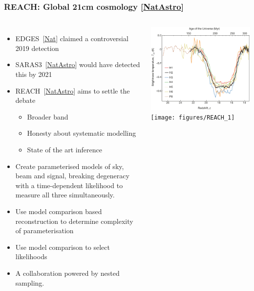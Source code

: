 \documentclass[aspectratio=169]{beamer}
\begin{document}
\begin{frame}
    \frametitle{REACH: Global 21cm cosmology [\href{https://www.nature.com/articles/s41550-022-01709-9}{NatAstro}]}
    \begin{columns}
        \begin{itemize}
            \item EDGES~[\href{https://www.nature.com/articles/nature25792}{Nat}] claimed a controversial 2019 detection
            \item SARAS3~[\href{https://www.nature.com/articles/s41550-022-01610-5}{NatAstro}]  would have detected this by 2021
            \item REACH~[\href{https://www.nature.com/articles/s41550-022-01709-9}{NatAstro}] aims to settle the debate
                \begin{itemize}
                    \item Broader band
                    \item Honesty about systematic modelling
                    \item State of the art inference
                \end{itemize}
            \item Create parameterised models of sky, beam and signal, breaking degeneracy with a time-dependent likelihood to measure all three simultaneously.
            \item Use model comparison based reconstruction to determine complexity of parameterisation
            \item Use model comparison to select likelihoods
            \item A collaboration powered by nested sampling.
        \end{itemize}

        \includegraphics[width=\textwidth]{figures/EDGES}
        \texttt{[image: figures/REACH\_1]}

    \end{columns}

\end{frame}
\end{document}

